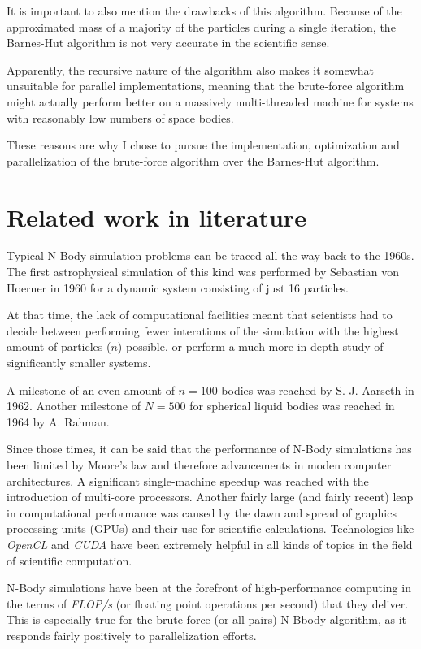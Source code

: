 \documentclass[journal]{IEEEtran}
\begin{document}
		It is important to also mention the drawbacks of this algorithm. Because of the approximated mass of a majority of the particles during a single iteration, the Barnes-Hut algorithm is not very accurate in the scientific sense. 
		
		Apparently, the recursive nature of the algorithm also makes it somewhat unsuitable for parallel implementations, meaning that the brute-force algorithm might actually perform better on a massively multi-threaded machine for systems with reasonably low numbers of space bodies.
		
		These reasons are why I chose to pursue the implementation, optimization and parallelization of the brute-force algorithm over the Barnes-Hut algorithm.
	
	\section{Related work in literature}
	
		Typical N-Body simulation problems can be traced all the way back to the 1960s. The first astrophysical simulation of this kind was performed by Sebastian von Hoerner in 1960 for a dynamic system consisting of just 16 particles. \cite{camb_book}
		
		At that time, the lack of computational facilities meant that scientists had to decide between performing fewer interations of the simulation with the highest amount of particles ($n$)  possible, or perform a much more in-depth study of significantly smaller systems.\cite{camb_book}
		
		A milestone of an even amount of $n=100$ bodies was reached by S. J. Aarseth in 1962. Another milestone of $N=500$ for spherical liquid bodies was reached in 1964 by A. Rahman. \cite{history}
		
		Since those times, it can be said that the performance of N-Body simulations has been limited by Moore’s law and therefore advancements in moden computer architectures. A significant single-machine speedup was reached with the introduction of multi-core processors. Another fairly large (and fairly recent) leap in computational performance was caused by the dawn and spread of graphics processing units (GPUs) and their use for scientific calculations. Technologies like \textit{OpenCL} and \textit{CUDA} have been extremely helpful in all kinds of topics in the field of scientific computation.
		
		N-Body simulations have been at the forefront of high-performance computing in the terms of \textit{FLOP/s} (or floating point operations per second) that they deliver.\cite{history} This is especially true for the brute-force (or all-pairs) N-Bbody algorithm, as it responds fairly positively to parallelization efforts. 
		
\end{document}
